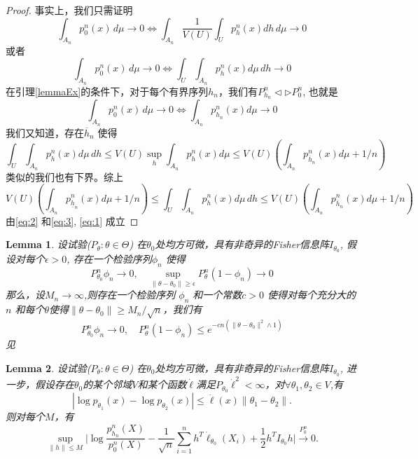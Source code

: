 \documentclass[review]{elsarticle}
\newtheorem{lemma}{Lemma}
\begin{document}
\begin{proof}
    事实上，我们只需证明
\begin{equation}
\int_{A_n}p_0^n(x)\, d\mu \to 0 \Leftrightarrow \int_{A_n}\frac{1}{V(U)}\int_U p_h^n(x) dh \, d\mu \to 0
\end{equation}
或者
\begin{equation}\label{eq:1}
\int_{A_n}p_0^n(x)\, d\mu \to 0 \Leftrightarrow \int_{U}\int_{A_n} p_h^n(x) d\mu \, dh \to 0
\end{equation}
在引理\ref{lemmaEx}的条件下，对于每个有界序列$h_n$，我们有$P_{h_n}^n\triangleleft \triangleright P_{0}^n$, 也就是
\begin{equation}\label{eq:2}
\int_{A_n}p_0^n(x)\, d\mu \to 0 \Leftrightarrow \int_{A_n} p_{h_n}^n(x) d\mu  \to 0
\end{equation}
我们又知道，存在$\overline{h}_n$ 使得
\begin{equation}
\int_{U}\int_{A_n} p_h^n(x) d\mu \, dh
\leq V(U)\sup_{h}\int_{A_n} p_h^n(x) d\mu
\leq V(U)(\int_{A_n}p^n_{\overline{h}_n}(x)d\mu +1/n)
\end{equation}
类似的我们也有下界。综上
\begin{equation}\label{eq:3}
 V(U)(\int_{A_n}p^n_{\underline{h}_n}(x)d\mu +1/n)
\leq \int_{U}\int_{A_n} p_h^n(x) d\mu \, dh
\leq V(U)(\int_{A_n}p^n_{\overline{h}_n}(x)d\mu +1/n)
\end{equation}
由\eqref{eq:2} 和\eqref{eq:3}, \eqref{eq:1} 成立
\end{proof}

\begin{lemma}\label{lemmaTest}
设试验($P_\theta :\theta\in \Theta$) 在$\theta_0$处均方可微，具有非奇异的Fisher信息阵$I_{\theta_0}$, 假设对每个$\epsilon>0$, 存在一个检验序列$\phi_n$ 使得
$$
P_{\theta_0}^n \phi_n \to 0,\quad \sup_{\|\theta-\theta_0\|\geq \epsilon}P_{\theta}^n (1-\phi_n)\to 0
$$
那么，设$M_n\to \infty$,则存在一个检验序列 $\phi_n$ 和一个常数$c>0$ 使得对每个充分大的$n$ 和每个$\theta$使得$\|\theta-\theta_0\|\geq M_n /\sqrt{n}$，我们有
$$
P_{\theta_0}^n\phi_n \to 0, \quad P_\theta^n (1-\phi_n)\leq e^{-cn(\|\theta-\theta_0\|^2\wedge 1)}
$$
见\cite{van2000asymptotic}
\end{lemma}
\begin{lemma}\label{lemmaUniform}
设试验($P_\theta :\theta\in \Theta$) 在$\theta_0$处均方可微，具有非奇异的Fisher信息阵$I_{\theta_0}$, 进一步，假设存在$\theta_0$的某个邻域$V$和某个函数$\dot{\ell}$满足$P_{\theta_0}\dot{\ell}^2<\infty$，对$\forall \theta_1,\theta_2\in V$,有
    \begin{equation}
        |\log p_{\theta_1}(x)-\log p_{\theta_2}(x)|\leq \dot{\ell}(x)\|\theta_1-\theta_2\|.
    \end{equation}
则对每个$M$，有
    \begin{equation}
        \sup_{\|h\|\leq M}\Big|
         \log \frac{p^n_{h_n}(X)}{p^n_0(X)}-\frac{1}{\sqrt{n}}\sum^n_{i=1}h^T\dot{\ell}_{\theta_0}(X_i)+\frac{1}{2}h^TI_{\theta_0}h
        \Big|\xrightarrow{P^n_0}0.
    \end{equation}
\end{lemma}
\end{document}
